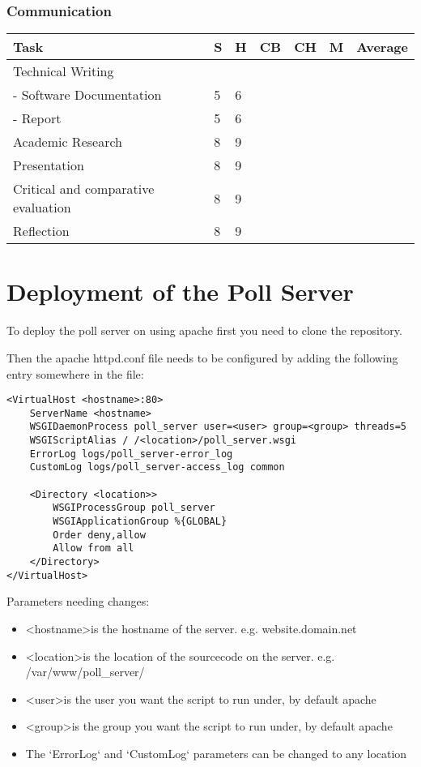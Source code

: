 \subsection{Communication} 
\begin{tabular}{ l || l | l | l | l | l || l}
  Task & S & H & CB & CH & M & Average \\ \hline
  Technical Writing\\ 
   - Software Documentation & 5 & 6 \\
   - Report & 5 & 6 \\
  Academic Research & 8 & 9 \\
  Presentation & 8 & 9 \\
  Critical and comparative evaluation & 8 & 9 \\
  Reflection & 8 & 9 \\
\end{tabular}

\chapter{Deployment of the Poll Server} \label{Chapter:Deployment Poll Server}

To deploy the poll server on using apache first you need to clone the repository.

Then the apache httpd.conf file needs to be configured by adding the following entry somewhere in the file:

\begin{lstlisting}[caption={\label{code:apacheConfig} Apache configuration}]
<VirtualHost <hostname>:80>
	ServerName <hostname>
	WSGIDaemonProcess poll_server user=<user> group=<group> threads=5
	WSGIScriptAlias / /<location>/poll_server.wsgi
	ErrorLog logs/poll_server-error_log
	CustomLog logs/poll_server-access_log common

	<Directory <location>>
		WSGIProcessGroup poll_server
		WSGIApplicationGroup %{GLOBAL}
		Order deny,allow
		Allow from all
	</Directory>
</VirtualHost>
\end{lstlisting}

Parameters needing changes:

\begin{itemize}
\item \textless hostname\textgreater is the hostname of the server. e.g. website.domain.net
\item \textless location\textgreater is the location of the sourcecode on the server. e.g. /var/www/poll\_server/
\item \textless user\textgreater is the user you want the script to run under, by default apache
\item \textless group\textgreater is the group you want the script to run under, by default apache
\item The `ErrorLog` and `CustomLog` parameters can be changed to any location

\end{itemize}

